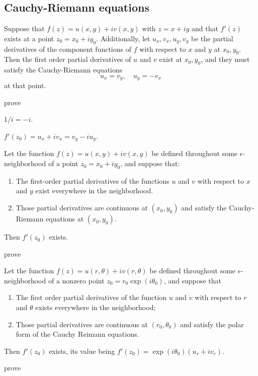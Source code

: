 \documentclass{article}
\begin{document}
\subsection{Cauchy-Riemann equations}
\begin{theorem}
	Suppose that \(f(z)=u(x,y)+iv(x,y)\) with \(z=x+iy\) and that \(f'(z)\) exists at a point \(z_0=x_0+iy_0\). Additionally, let \(u_x,v_x,u_y,v_y\) be the partial derivatives of the component functions of \(f\) with respect to \(x\) and \(y\) at \(x_0,y_0\). Then the first order partial derivatives of \(u\) and \(v\) exist at \(x_0,y_0\), and they must satisfy the Cauchy-Riemann equations
	\begin{equation*}
		u_x=v_y,\quad u_y=-v_x
	\end{equation*}
	at that point.
\end{theorem}
\begin{IEEEproof}
	prove
\end{IEEEproof}
\begin{remark}
	\(1/i=-i\).
\end{remark}
\begin{corollary}
	\(f'(z_0)=u_x+iv_x=v_y-iu_y\).
\end{corollary}
\begin{theorem}
	Let the function \(f(z)=u(x,y)+iv(x,y)\) be defined throughout some \(\epsilon\)-neighborhood of a point \(z_0=x_0+iy_0\), and suppose that:
	\begin{enumerate}
		\item The first-order partial derivatives of the functions \(u\) and \(v\) with respect to \(x\) and \(y\) exist everywhere in the neighborhood.
		\item Those partial derivatives are continuous at \((x_0,y_0)\) and satisfy the Cauchy-Riemann equations at \((x_0, y_0)\).
	\end{enumerate}
	Then \(f'(z_0)\) exists.
\end{theorem}
\begin{IEEEproof}
	prove
\end{IEEEproof}
\begin{theorem}
	Let the function \(f(z)=u(r,\theta)+iv(r,\theta)\) be defined throughout some \(\epsilon\)-neighborhood of a nonzero point \(z_0=r_0\exp(i\theta_0)\), and suppose that
	\begin{enumerate}
		\item The first order partial derivatives of the function \(u\) and \(v\) with respect to \(r\) and \(\theta\) exists everywhere in the neighborhood;
		\item Those partial derivatives are continuous at \((r_0,\theta_0)\) and satisfy the polar form of the Cauchy Reimann equations.
	\end{enumerate}
	Then \(f'(z_0)\) exists, its value being \(f'(z_0)=\exp(i\theta_0)(u_r+iv_r)\).
\end{theorem}
\begin{IEEEproof}
	prove
\end{IEEEproof}
\end{document}
